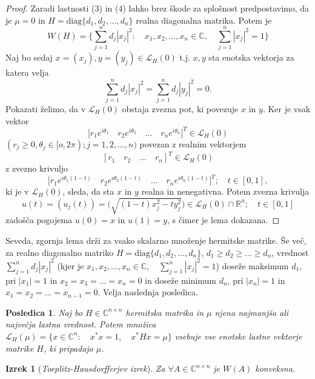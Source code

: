 \documentclass[12pt,a4paper]{amsart}
\theoremstyle{definition}
\theoremstyle{plain}
\newtheorem{izrek}[definicija]{Izrek}
\newtheorem{posledica}[definicija]{Posledica}
\newcommand{\LH}{\mathcal{L}}
\newcommand{\R}{\mathbb R}
\newcommand{\C}{\mathbb C}
\begin{document}
\begin{proof}
Zaradi lastnosti (3) in (4) lahko brez škode za splošnost predpostavimo, da je $\mu=0$ in $H=\text{diag}\{d_1,d_2,\dots,d_n\}$ realna diagonalna matrika.
Potem je 
$$W(H)=\Big\{ \sum_{j=1}^{n} d_j|x_j|^2:\quad x_1,x_2,\dots,x_n \in \C,\quad \sum_{j=1}^{n} |x_j|^2=1\Big \}$$
Naj bo sedaj $x=(x_j), y=(y_j)\in \LH_{H}(0)$ t.j. $x,y$ sta enotska vektorja za katera velja 
$$\sum_{j=1}^{n} d_j|x_j|^2=\sum_{j=1}^{n} d_j|y_j|^2=0.$$
 Pokazati želimo, da v $\LH_{H}(0)$ obstaja zvezna pot, ki povezuje $x$ in $y$. Ker je vsak vektor 
$$\Big[r_1 e^{i\theta_1}\quad  r_2 e^{i\theta_2}\quad  \dots\quad r_n e^{i\theta_n}\Big]^T \in \LH_{H}(0)$$  
$(r_j \geq 0, \theta_j\in [o, 2\pi); j=1,2,\dots,n)$ povezan z realnim vektorjem 
$$[r_1 \quad r_2 \quad \dots \quad r_n]^T \in \LH_{H}(0)$$
 z zvezno krivuljo
$$\Big[r_1 e^{i\theta_1(1-t)}\quad  r_2 e^{i\theta_2(1-t)}\quad  \dots\quad  r_n e^{i\theta_n(1-t)}\Big]^T; \quad t\in[0,1],$$
ki je v $\LH_{H}(0)$, sleda, da sta $x$ in $y$ realna in nenegativna. Potem zvezna krivulja
$$u(t)=(u_j(t))=\Big(\sqrt{(1-t)x^2_j -ty^2_j}\Big) \in \LH_{H}(0)\cap \R^n ; \quad t\in [0,1]$$
zadošča pogojema $u (0)=x$ in $u (1) =y$, s čimer je lema dokazana.
\end{proof}

Seveda, zgornja lema drži za vsako skalarno množenje hermitske matrike. 
Še več, za realno diagonalno matriko $H=\text{diag}\{d_1,d_2,\dots,d_n\}$, $d_1\geq d_2\geq \dots \geq d_n$, vrednost $\sum_{j=1}^{n} d_j|x_j|^2$ 
(kjer je $x_1,x_2,\dots, x_n \in \C,\quad \sum_{j=1}^{n}|x_j|^2 =1$) doseže maksimum $d_1$, pri $|x_1|=1$ in $x_2=x_3=\dots=x_n=0$ in doseže minimum $d_n$, pri $|x_n|=1$ in $x_1=x_2=\dots=x_{n-1}=0$. Velja naslednja posledica.

\begin{posledica}
Naj bo $H\in \C^{n\times n}$ hermitska matrika in $\mu$ njena najmanjša ali največja lastna vrednost. Potem množica $\LH_{H}(\mu)=\{x\in \C^n:\quad x^\ast x=1,\quad x^\ast Hx=\mu \}$ vsebuje vse enotske lastne vektorje matrike $H$, ki pripadajo $\mu$.
\end{posledica}

\begin{izrek}[\emph{Toeplitz-Hausdorfferjev izrek}]
Za $\forall A\in \C^{n\times n}$ je $W(A)$ konveksna.
\end{izrek}
\end{document}
